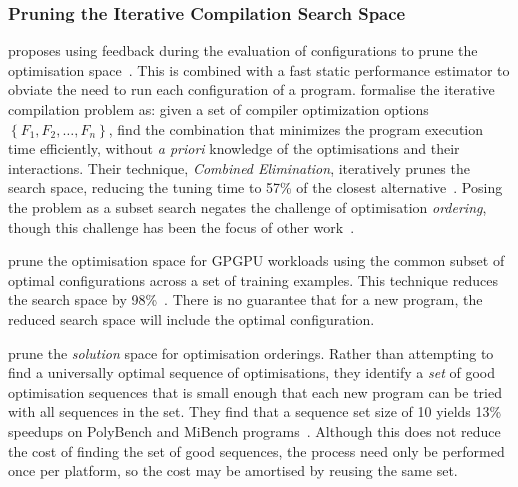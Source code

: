 \subsubsection{Pruning the Iterative Compilation Search Space}

\citeauthor{Triantafyllis2003} proposes using feedback during the evaluation of configurations to prune the optimisation space~\cite{Triantafyllis2003}. This is combined with a fast static performance estimator to obviate the need to run each configuration of a program. \citeauthor{Pan2006} formalise the iterative compilation problem as: given a set of compiler optimization options $\left\{ F_1, F_2, \ldots, F_n \right\}$, find the combination that minimizes the program execution time efficiently, without \emph{a priori} knowledge of the optimisations and their interactions. Their technique, \emph{Combined Elimination}, iteratively prunes the search space, reducing the tuning time to 57\% of the closest alternative~\cite{Pan2006}. Posing the problem as a subset search negates the challenge of optimisation \emph{ordering}, though this challenge has been the focus of other work~\cite{Kulkarni2012,Purini2013}.

\citeauthor{Ryoo2008} prune the optimisation space for GPGPU workloads using the common subset of optimal configurations across a set of training examples. This technique reduces the search space by 98\%~\cite{Ryoo2008}. There is no guarantee that for a new program, the reduced search space will include the optimal configuration.

\citeauthor{Purini2013} prune the \emph{solution} space for optimisation orderings. Rather than attempting to find a universally optimal sequence of optimisations, they identify a \emph{set} of good optimisation sequences that is small enough that each new program can be tried with all sequences in the set. They find that a sequence set size of 10 yields 13\% speedups on PolyBench and MiBench programs~\cite{Purini2013}. Although this does not reduce the cost of finding the set of good sequences, the process need only be performed once per platform, so the cost may be amortised by reusing the same set.

